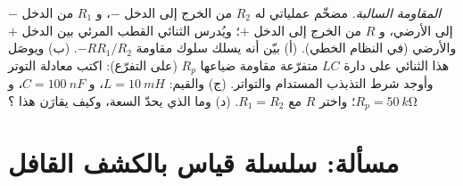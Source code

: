 \begin{exercise}[$\star\star\star$]\label{exo:b2:feedback-oscillators:12}
\emph{المقاومة السالبة.} مضخّم عملياتي له $R_2$ من الخرج إلى الدخل
$-$، و $R_1$ من الدخل $-$ إلى الأرضي، و $R$ من الخرج إلى الدخل $+$؛
ويُدرس الثنائي القطب المرئي بين الدخل $+$ والأرضي (في النظام
الخطي). (أ) بيّن أنه يسلك سلوك مقاومة $-RR_1/R_2$. (ب) ويوصَل هذا
الثنائي على دارة $LC$ متفرّعة مقاومة ضياعها
$R_p$ (على التفرّع): اكتب معادلة التوتر وأوجد
شرط التذبذب المستدام والتواتر. (ج) والقيم: $L
= \qty{10}{mH}$، و $C = \qty{100}{nF}$، و $R_p = \qty{50}{k\ohm}$؛ واختر $R$ مع $R_1 =
R_2$. (د) وما الذي يحدّ السعة، وكيف يقارَن هذا ؟
\end{exercise}

\section{مسألة: سلسلة قياس بالكشف القافل}

